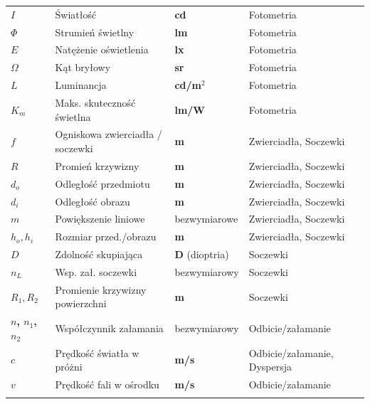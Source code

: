 \documentclass[12pt,a4paper]{article}
\begin{document}
\begin{longtable}{>{\bfseries}p{2.0cm} p{7.0cm} p{3.2cm} p{2.5cm}}
\rowcolor{rowfoto}
$I$            & Światłość        & \textbf{cd}                & Fotometria \\
\rowcolor{rowfoto}
$\Phi$         & Strumień świetlny & \textbf{lm}               & Fotometria \\
\rowcolor{rowfoto}
$E$            & Natężenie oświetlenia & \textbf{lx}            & Fotometria \\
\rowcolor{rowfoto}
$\Omega$       & Kąt bryłowy      & \textbf{sr}                & Fotometria \\
\rowcolor{rowfoto}
$L$            & Luminancja       & \textbf{cd/m}$^2$          & Fotometria \\
\rowcolor{rowfoto}
$K_m$          & Maks. skuteczność świetlna & \textbf{lm/W}    & Fotometria \\
\rowcolor{rowzwierc}
$f$            & Ogniskowa zwierciadła / soczewki & \textbf{m}  & Zwierciadła, Soczewki \\
\rowcolor{rowzwierc}
$R$            & Promień krzywizny & \textbf{m}                & Zwierciadła, Soczewki \\
\rowcolor{rowzwierc}
$d_o$          & Odległość przedmiotu & \textbf{m}             & Zwierciadła, Soczewki \\
\rowcolor{rowzwierc}
$d_i$          & Odległość obrazu  & \textbf{m}               & Zwierciadła, Soczewki \\
\rowcolor{rowzwierc}
$m$            & Powiększenie liniowe & bezwymiarowe            & Zwierciadła, Soczewki \\
\rowcolor{rowzwierc}
$h_o, h_i$     & Rozmiar przed./obrazu & \textbf{m}           & Zwierciadła, Soczewki \\
\rowcolor{rowsocz}
$D$            & Zdolność skupiająca & \textbf{D} (dioptria)   & Soczewki \\
\rowcolor{rowsocz}
$n_L$          & Wsp. zał. soczewki & bezwymiarowy             & Soczewki \\
\rowcolor{rowsocz}
$R_1, R_2$     & Promienie krzywizny powierzchni & \textbf{m}  & Soczewki \\
\rowcolor{rowodbl}
$n$, $n_1$, $n_2$ & Współczynnik załamania & bezwymiarowy      & Odbicie/załamanie \\
\rowcolor{rowodbl}
$c$            & Prędkość światła w próżni & \textbf{m/s}       & Odbicie/załamanie, Dyspersja \\
\rowcolor{rowodbl}
$v$            & Prędkość fali w ośrodku & \textbf{m/s}         & Odbicie/załamanie \\
\rowcolor{rowodbl}

\end{longtable}
\end{document}
